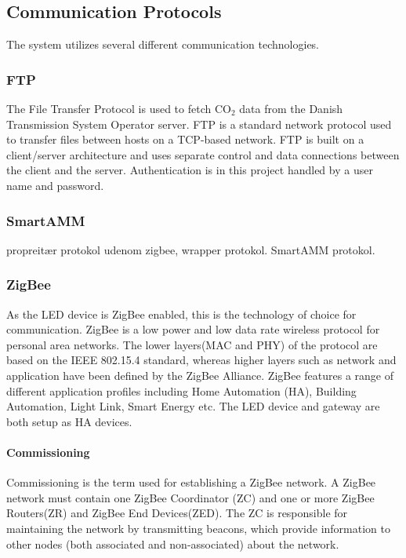 \documentclass[Main]{subfiles}
\begin{document}
	\subsection{Communication Protocols}
		The system utilizes several different communication technologies.

		\subsubsection{FTP}
			The File Transfer Protocol is used to fetch CO$_2$ data from the Danish Transmission System Operator server.
			FTP is a standard network protocol used to transfer files between hosts on a TCP-based network\cite{FTPWikipedia:Online}.
			FTP is built on a client/server architecture and uses separate control and data connections between the client and the server\cite{TCPIPProtocol}.
			Authentication is in this project handled by a user name and password.  


		\subsubsection{SmartAMM}
			propreitær protokol udenom zigbee, wrapper protokol. SmartAMM protokol. 

		\subsubsection{ZigBee}
			As the LED device is ZigBee enabled, this is the technology of choice for communication. 
			ZigBee is a low power and low data rate wireless protocol for personal area networks. 
			The lower layers(MAC and PHY) of the protocol are based on the IEEE 802.15.4 standard\cite{ZigBeeSpec}, whereas higher layers such as network and application have been defined by the ZigBee Alliance.
			ZigBee features a range of different application profiles including Home Automation (HA), Building Automation, Light Link, Smart Energy etc\cite{ZigBeeApplicationProfiles:Online}.
			The LED device and gateway are both setup as HA devices. 

			\paragraph{Commissioning} %
				Commissioning is the term used for establishing a ZigBee network.
				A ZigBee network must contain one ZigBee Coordinator (ZC) and one or more ZigBee Routers(ZR) and ZigBee End Devices(ZED). 
				The ZC is responsible for maintaining the network by transmitting beacons, which provide information to other nodes (both associated and non-associated) about the network.
\end{document}
